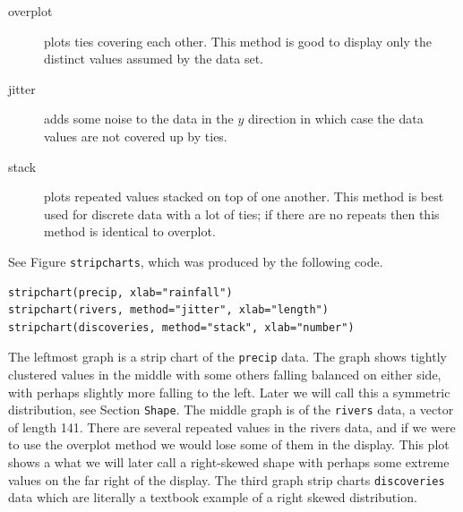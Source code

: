 \documentclass[10pt,english]{scrbook}
\begin{document}
\begin{description}
\item[overplot] plots ties covering each other. This method is good to display only the distinct values assumed by the data set.

\item[jitter] adds some noise to the data in the \(y\) direction in which case the data values are not covered up by ties.

\item[stack] plots repeated values stacked on top of one another. This method is best used for discrete data with a lot of ties; if there are no repeats then this method is identical to overplot.
\end{description}

See Figure \texttt{stripcharts}, which was produced by the following code.

\begin{verbatim}
stripchart(precip, xlab="rainfall")
stripchart(rivers, method="jitter", xlab="length")
stripchart(discoveries, method="stack", xlab="number")
\end{verbatim}

The leftmost graph is a strip chart of the \texttt{precip} data. The graph shows tightly clustered values in the middle with some others falling balanced on either side, with perhaps slightly more falling to the left. Later we will call this a symmetric distribution, see Section \texttt{Shape}. The middle graph is of the \texttt{rivers} data, a vector of length 141. There are several repeated values in the rivers data, and if we were to use the overplot method we would lose some of them in the display. This plot shows a what we will later call a right-skewed shape with perhaps some extreme values on the far right of the display. The third graph strip charts \texttt{discoveries} data which are literally a textbook example of a right skewed distribution.
\end{document}
